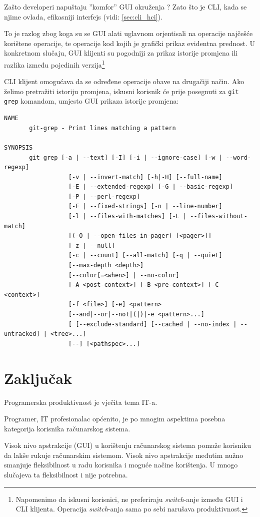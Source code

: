 \documentclass[times, utf8, seminar]{fit}
\begin{document}
Zašto developeri napuštaju ''komfor'' GUI okruženja ? Zato što je CLI, kada se njime ovlada, efikasniji interfejs (vidi: \ref{sec:cli_hci}).

To je razlog zbog koga su se GUI alati uglavnom orjentisali na operacije najčešće korištene operacije, te operacije kod kojih je grafički prikaz evidentna prednost. U konkretnom slučaju, GUI klijenti su pogodniji za prikaz istorije promjena ili razlika između pojedinih verzija\footnote{Napomenimo da iskusni korisnici, ne preferiraju \emph{switch}-anje između GUI i CLI klijenta. Operacija \emph{switch}-anja sama po sebi narušava produktivnost.}


CLI klijent omogućava da se određene operacije obave na drugačiji način. Ako želimo pretražiti istoriju promjena, iskusni korisnik će prije posegnuti za \verb+git grep+ komandom, umjesto GUI prikaza istorije promjena:

\begin{lstlisting}  
NAME
       git-grep - Print lines matching a pattern

SYNOPSIS
       git grep [-a | --text] [-I] [-i | --ignore-case] [-w | --word-regexp]
                  [-v | --invert-match] [-h|-H] [--full-name]
                  [-E | --extended-regexp] [-G | --basic-regexp]
                  [-P | --perl-regexp]
                  [-F | --fixed-strings] [-n | --line-number]
                  [-l | --files-with-matches] [-L | --files-without-match]
                  [(-O | --open-files-in-pager) [<pager>]]
                  [-z | --null]
                  [-c | --count] [--all-match] [-q | --quiet]
                  [--max-depth <depth>]
                  [--color[=<when>] | --no-color]
                  [-A <post-context>] [-B <pre-context>] [-C <context>]
                  [-f <file>] [-e] <pattern>
                  [--and|--or|--not|(|)|-e <pattern>...]
                  [ [--exclude-standard] [--cached | --no-index | --untracked] | <tree>...]
                  [--] [<pathspec>...]
\end{lstlisting}


\chapter{Zaključak}

Programerska produktivnost je vječita tema IT-a. 

Programer, IT profesionalac općenito, je po mnogim aspektima posebna kategorija korisnika računarskog sistema. 

Visok nivo apstrakcije (GUI) u korištenju računarskog sistema pomaže korisniku da lakše rukuje računarskim sistemom. Visok nivo apstrakcije međutim nužno smanjuje fleksibilnost u radu korisnika i moguće načine korištenja. U mnogo slučajeva ta fleksibilnost i nije potrebna. 
\end{document}
